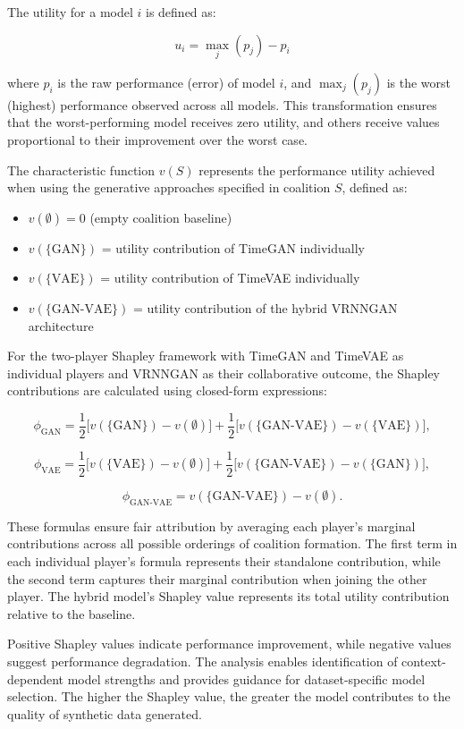 \documentclass[11pt]{article}
\begin{document}
The utility for a model \( i \) is defined as:

\[
u_i = \max_j(p_j) - p_i
\]

where \( p_i \) is the raw performance (error) of model \( i \), and \( \max_j(p_j) \) is the worst (highest) performance observed across all models. This transformation ensures that the worst-performing model receives zero utility, and others receive values proportional to their improvement over the worst case.

The characteristic function $v(S)$ represents the performance utility achieved when using the generative approaches specified in coalition $S$, defined as:
\begin{itemize}
    \item \( v(\emptyset) = 0 \) (empty coalition baseline)
    \item \( v(\{\text{GAN}\}) \) = utility contribution of TimeGAN individually
    \item \( v(\{\text{VAE}\}) \) = utility contribution of TimeVAE individually  
    \item \( v(\{\text{GAN-VAE}\}) \) = utility contribution of the hybrid VRNNGAN architecture
\end{itemize}

For the two-player Shapley framework with TimeGAN and TimeVAE as individual players and VRNNGAN as their collaborative outcome, the Shapley contributions are calculated using closed-form expressions:

\[
\phi_{\text{GAN}} = \frac{1}{2} \big[v(\{\text{GAN}\}) - v(\emptyset)\big] + \frac{1}{2} \big[v(\{\text{GAN-VAE}\}) - v(\{\text{VAE}\})\big],
\]

\[
\phi_{\text{VAE}} = \frac{1}{2} \big[v(\{\text{VAE}\}) - v(\emptyset)\big] + \frac{1}{2} \big[v(\{\text{GAN-VAE}\}) - v(\{\text{GAN}\})\big],
\]

\[
\phi_{\text{GAN-VAE}} = v(\{\text{GAN-VAE}\}) - v(\emptyset).
\]

These formulas ensure fair attribution by averaging each player's marginal contributions across all possible orderings of coalition formation. The first term in each individual player's formula represents their standalone contribution, while the second term captures their marginal contribution when joining the other player. The hybrid model's Shapley value represents its total utility contribution relative to the baseline.

Positive Shapley values indicate performance improvement, while negative values suggest performance degradation. The analysis enables identification of context-dependent model strengths and provides guidance for dataset-specific model selection. The higher the Shapley value, the greater the model contributes to the quality of synthetic data generated.
\end{document}
